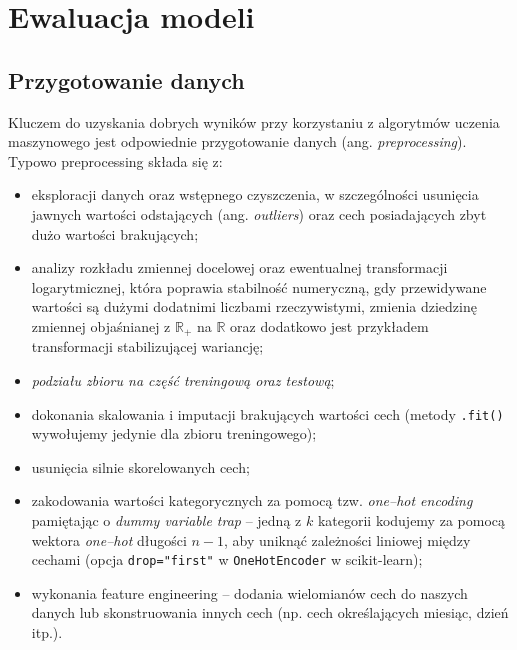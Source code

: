 \documentclass{myclass}
\begin{document}
\section{Ewaluacja modeli}

\subsection{Przygotowanie danych}

Kluczem do uzyskania dobrych wyników przy korzystaniu z algorytmów uczenia maszynowego jest
odpowiednie przygotowanie danych (ang. \emph{preprocessing}). Typowo preprocessing składa się z:

\begin{itemize}
\item eksploracji danych oraz wstępnego czyszczenia, w szczególności usunięcia jawnych wartości
odstających (ang. \emph{outliers}) oraz cech posiadających zbyt dużo wartości brakujących;

\item analizy rozkładu zmiennej docelowej oraz ewentualnej transformacji logarytmicznej, która
poprawia stabilność numeryczną, gdy przewidywane wartości są dużymi dodatnimi liczbami
rzeczywistymi, zmienia dziedzinę zmiennej objaśnianej z \(\mathbb{R}_+\) na \(\mathbb{R}\) oraz
dodatkowo jest przykładem transformacji stabilizującej wariancję;
    
\item \emph{podziału zbioru na część treningową oraz testową};

\item dokonania skalowania i imputacji brakujących wartości cech (metody \texttt{.fit()} wywołujemy
jedynie dla zbioru treningowego);

\item usunięcia silnie skorelowanych cech;

\item zakodowania wartości kategorycznych za pomocą tzw. \emph{one--hot encoding} pamiętając o
\emph{dummy variable trap} -- jedną z \(k\) kategorii kodujemy za pomocą wektora \emph{one--hot}
długości \(n-1\), aby uniknąć zależności liniowej między cechami (opcja \texttt{drop="first"} w
\texttt{OneHotEncoder} w scikit-learn);

\item wykonania feature engineering -- dodania wielomianów cech do naszych danych lub skonstruowania
innych cech (np. cech określających miesiąc, dzień itp.).
\end{itemize}
\end{document}
